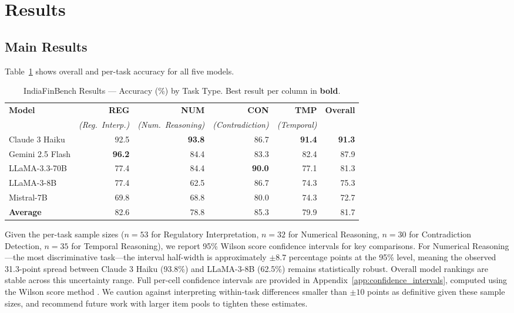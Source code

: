 \documentclass[11pt]{article}
\begin{document}
\section{Results}

\subsection{Main Results}
\label{sec:main_results}

Table~\ref{tab:main_results} shows overall and per-task accuracy for all five
models.

\begin{table}[t]
\centering
\caption{IndiaFinBench Results --- Accuracy (\%) by Task Type. Best result per column in \textbf{bold}.}
\label{tab:main_results}
\begin{tabular}{lrrrrr}
\toprule
\textbf{Model} & \textbf{REG} & \textbf{NUM} & \textbf{CON} & \textbf{TMP} & \textbf{Overall} \\
               & \textit{(Reg.\ Interp.)} & \textit{(Num.\ Reasoning)} & \textit{(Contradiction)} & \textit{(Temporal)} & \\
\midrule
Claude 3 Haiku      & 92.5 & \textbf{93.8} & 86.7 & \textbf{91.4} & \textbf{91.3} \\
Gemini 2.5 Flash    & \textbf{96.2} & 84.4 & 83.3 & 82.4 & 87.9 \\
LLaMA-3.3-70B       & 77.4 & 84.4 & \textbf{90.0} & 77.1 & 81.3 \\
LLaMA-3-8B          & 77.4 & 62.5 & 86.7 & 74.3 & 75.3 \\
Mistral-7B          & 69.8 & 68.8 & 80.0 & 74.3 & 72.7 \\
\midrule
\textbf{Average}    & 82.6 & 78.8 & 85.3 & 79.9 & 81.7 \\
\bottomrule
\end{tabular}
\end{table}

Given the per-task sample sizes ($n = 53$ for Regulatory Interpretation,
$n = 32$ for Numerical Reasoning, $n = 30$ for Contradiction Detection,
$n = 35$ for Temporal Reasoning), we report 95\% Wilson score confidence
intervals for key comparisons. For Numerical Reasoning---the most
discriminative task---the interval half-width is approximately ${\pm}8.7$
percentage points at the 95\% level, meaning the observed 31.3-point spread
between Claude 3 Haiku (93.8\%) and LLaMA-3-8B (62.5\%) remains statistically
robust. Overall model rankings are stable across this uncertainty range. Full
per-cell confidence intervals are provided in
Appendix~\ref{app:confidence_intervals}, computed using the Wilson score method
\citep{wilson1927probable}. We caution against interpreting within-task
differences smaller than ${\pm}10$ points as definitive given these sample
sizes, and recommend future work with larger item pools to tighten these
estimates.
\end{document}
